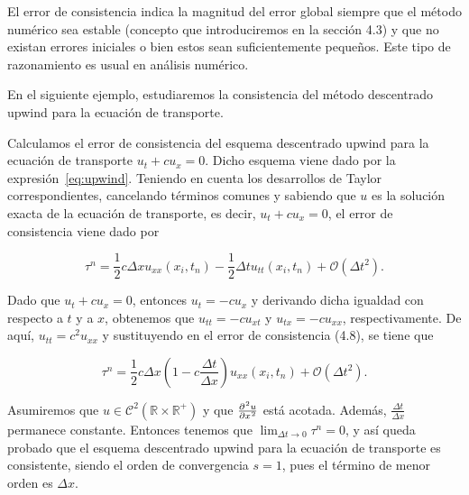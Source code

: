 \begin{remark}
  El error de consistencia indica la magnitud del error global
  siempre que el método numérico sea estable
  (concepto que introduciremos en la sección 4.3) y que no existan
  errores iniciales o bien estos sean suficientemente pequeños.
  Este tipo de razonamiento es usual en análisis numérico.
\end{remark}

En el siguiente ejemplo, estudiaremos la consistencia del método
descentrado upwind para la ecuación de transporte.

\begin{example}
  Calculamos el error de consistencia del esquema descentrado upwind
  para la ecuación de transporte
  \begin{math}
    u_{t}+
    cu_{x}=
    0.
  \end{math}
  Dicho esquema viene dado por la expresión~\eqref{eq:upwind}.
  Teniendo en cuenta los desarrollos de Taylor correspondientes,
  cancelando términos comunes y sabiendo que $u$ es la solución
  exacta de la ecuación de transporte, es decir,
  $u_{t}+cu_{x}=0$, el error de consistencia viene dado por

  \begin{equation*}
    \tau^{n}=
    \frac{1}{2}
    c\Delta x
    u_{xx}
    \left(x_{i},t_{n}\right)-
    \frac{1}{2}\Delta t
    u_{tt}
    \left(x_{i},t_{n}\right)+
    \mathcal{O}
    \left(\Delta t^{2}\right).
  \end{equation*}

  Dado que $u_{t}+cu_{x}=0$, entonces $u_{t}=-cu_{x}$ y derivando
  dicha igualdad con respecto a $t$ y a $x$, obtenemos que
  $u_{tt}=-cu_{xt}$ y $u_{tx}=-cu_{xx}$, respectivamente.
  De aquí, $u_{tt}=c^{2}u_{xx}$ y sustituyendo en el error de
  consistencia (4.8), se tiene que

  \begin{equation*}
    \tau^{n}=
    \frac{1}{2}
    c\Delta x
    \left(
    1-c\frac{\Delta t}{\Delta x}
    \right)
    u_{xx}
    \left(x_{i},t_{n}\right)+
    \mathcal{O}
    \left(\Delta t^{2}\right).
  \end{equation*}

  Asumiremos que
  \begin{math}
    u\in
    \mathcal{C}^{2}
    \left(
    \mathbb{R}\times
    \mathbb{R}^{+}
    \right)
  \end{math}
  y que $\diffp[2]{u}{x}$ está acotada.
  Además, $\frac{\Delta t}{\Delta x}$ permanece constante.
  Entonces tenemos que $\lim_{\Delta t\to0}\tau^{n}=0$, y así queda
  probado que el esquema descentrado upwind para la
  ecuación de transporte es consistente, siendo el orden de
  convergencia $s=1$, pues el término de menor orden es $\Delta x$.
\end{example}


